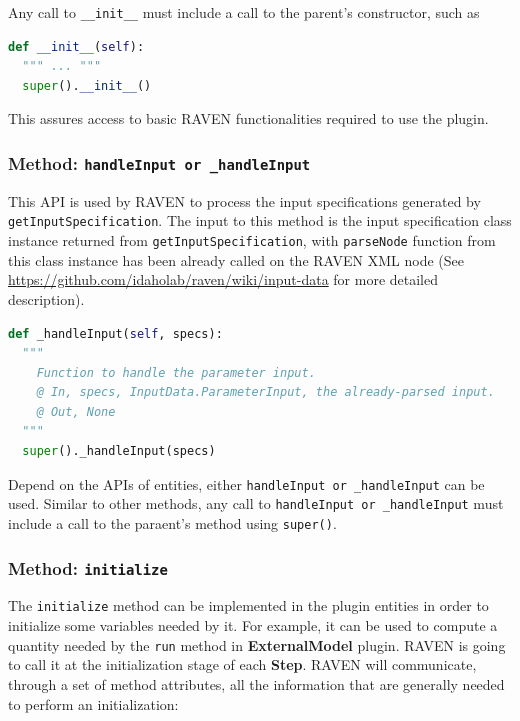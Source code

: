 Any call to \texttt{\_\_init\_\_} must include a call to the parent's constructor, such as
\begin{lstlisting}[language=python]
def __init__(self):
  """ ... """
  super().__init__()
\end{lstlisting}
This assures access to basic RAVEN functionalities required to use the plugin.

\subsubsection{Method: \texttt{handleInput or \_handleInput}}
\label{subsubsec:handleInput}
This API is used by RAVEN to process the input specifications generated by \texttt{getInputSpecification}.
The input to this method is the input specification class instance returned from
\texttt{getInputSpecification}, with \texttt{parseNode} function from this class instance has been already called on the
RAVEN XML node (See \url{https://github.com/idaholab/raven/wiki/input-data} for more detailed description).

\begin{lstlisting}[language=python]
def _handleInput(self, specs):
  """
    Function to handle the parameter input.
    @ In, specs, InputData.ParameterInput, the already-parsed input.
    @ Out, None
  """
  super()._handleInput(specs)
\end{lstlisting}
Depend on the APIs of entities, either \texttt{handleInput or \_handleInput} can be used.
Similar to other methods, any call to \texttt{handleInput or \_handleInput} must include a call to the
paraent's method using \texttt{super()}.

\subsubsection{Method: \texttt{initialize}}
\label{subsubsec:initialize}
The \texttt{initialize} method can be implemented in the plugin entities in order
to initialize some variables needed by it. For example, it can be used to compute a quantity
needed by the \texttt{run} method in \textbf{ExternalModel} plugin. RAVEN is going to call it
at the initialization stage of each \textbf{Step}. RAVEN will communicate, through a set of method
attributes, all the information that are generally needed to perform an initialization:

